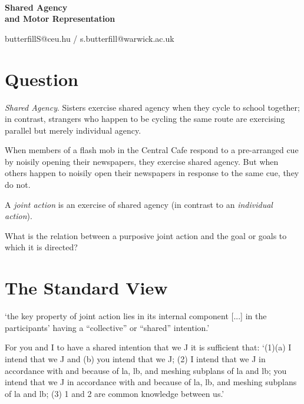 \documentclass[12pt]{extarticle}
\date{}
\begin{document}
\begin{multicols}{3}

\setlength\footnotesep{1em}






\

\begin{center}
{\Large
\textbf{Shared Agency \\and Motor Representation}
}


butterfillS@ceu.hu / s.butterfill@warwick.ac.uk

\end{center}


\section{Question}
\emph{Shared Agency}.  Sisters exercise shared agency when they cycle to school together; in contrast,  strangers who happen to be cycling the same route are exercising parallel but merely individual agency.\citep{gilbert_walking_1990}

When members of a flash mob in the Central Cafe respond to a pre-arranged cue by noisily opening their newspapers, they exercise shared agency. 
But when others happen to noisily open their newspapers in response to the same cue, they do not.\citep{Searle:1990em}


A \emph{joint action} is an exercise of shared agency (in contrast to an \emph{individual action}).

What is the relation between a purposive joint action and the goal or goals to which it is directed?



\section{The Standard View}
‘the key property of joint action lies in its internal component [...] in the participants’ having a “collective” or “shared” intention.’ \citep{alonso_shared_2009} %

For you and I to have a shared intention that we J it is sufficient that: `(1)(a) I intend that we J and (b) you intend that we J; (2) I intend that we J in accordance with and because of la, lb, and meshing subplans of la and lb; you intend that we J in accordance with and because of la, lb, and meshing subplans of la and lb; (3) 1 and 2 are common knowledge between us.'\citep%
{Bratman:1993je}


\end{multicols}
\end{document}
